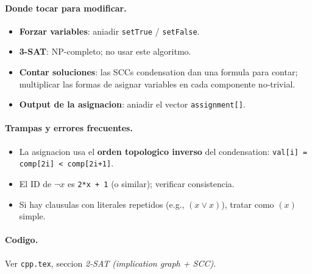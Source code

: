 \paragraph{Donde tocar para modificar.}
\begin{itemize}\setlength\itemsep{0pt}
	\item \textbf{Forzar variables}: aniadir \texttt{setTrue} / \texttt{setFalse}.
	\item \textbf{3-SAT}: NP-completo; no usar este algoritmo.
	\item \textbf{Contar soluciones}: las SCCs condensation dan una formula para contar; multiplicar las formas de asignar variables en cada componente no-trivial.
	\item \textbf{Output de la asignacion}: aniadir el vector \texttt{assignment[]}.
\end{itemize}

\paragraph{Trampas y errores frecuentes.}
\begin{itemize}\setlength\itemsep{0pt}
	\item La asignacion usa el \textbf{orden topologico inverso} del condensation: \texttt{val[i] = comp[2i] < comp[2i+1]}.
	\item El ID de $\neg x$ es \texttt{2*x + 1} (o similar); verificar consistencia.
	\item Si hay clausulas con literales repetidos (e.g., $(x \lor x)$), tratar como $(x)$ simple.
\end{itemize}

\paragraph{Codigo.}
Ver \texttt{cpp.tex}, seccion \textit{2-SAT (implication graph + SCC)}.

\vspace{0.5em}

